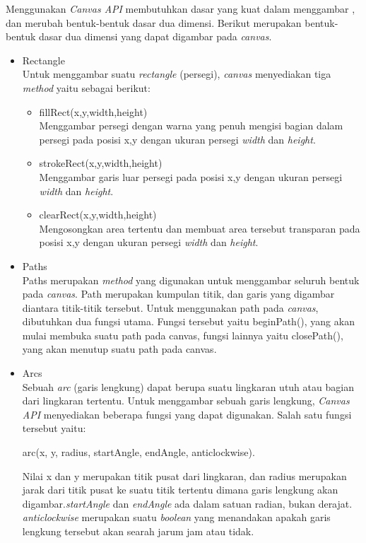 Menggunakan \textit{Canvas API} membutuhkan dasar yang kuat dalam menggambar , dan merubah bentuk-bentuk dasar dua dimensi. Berikut merupakan bentuk-bentuk dasar dua dimensi yang dapat digambar pada \textit{canvas}.

\begin{itemize}
	\item Rectangle \\
	Untuk menggambar suatu \textit{rectangle} (persegi), \textit{canvas} menyediakan tiga \textit{method} yaitu sebagai berikut:
	\begin{itemize}
		\item fillRect(x,y,width,height) \\
		Menggambar persegi dengan warna yang penuh mengisi bagian dalam persegi pada posisi x,y dengan ukuran persegi \textit{width} dan \textit{height}.
		\item strokeRect(x,y,width,height) \\
		Menggambar garis luar persegi pada posisi x,y dengan ukuran persegi \textit{width} dan \textit{height}.
		\item clearRect(x,y,width,height) \\
		Mengosongkan area tertentu dan membuat area tersebut transparan pada posisi x,y dengan ukuran persegi \textit{width} dan \textit{height}.
	\end{itemize}
	
	\item Paths\\
	Paths merupakan \textit{method} yang digunakan untuk menggambar seluruh bentuk pada \textit{canvas}. Path merupakan kumpulan titik, dan garis yang digambar diantara titik-titik tersebut. Untuk menggunakan path pada \textit{canvas}, dibutuhkan dua fungsi utama. Fungsi tersebut yaitu beginPath(), yang akan mulai membuka suatu path pada canvas, fungsi lainnya yaitu closePath(), yang akan menutup suatu path pada canvas.
	
	\item Arcs \\
	Sebuah \textit{arc} (garis lengkung) dapat berupa suatu lingkaran utuh atau bagian dari lingkaran tertentu. Untuk menggambar sebuah garis lengkung, \textit{Canvas API} menyediakan beberapa fungsi yang dapat digunakan. Salah satu fungsi tersebut yaitu: 
	
	arc(x, y, radius, startAngle, endAngle, anticlockwise).
	
	Nilai x dan y merupakan titik pusat dari lingkaran, dan radius merupakan jarak dari titik pusat ke suatu titik tertentu dimana garis lengkung akan digambar.\textit{startAngle} dan \textit{endAngle} ada dalam satuan radian, bukan derajat. \textit{anticlockwise} merupakan suatu \textit{boolean} yang menandakan apakah garis lengkung tersebut akan searah jarum jam atau tidak.
\end{itemize}

